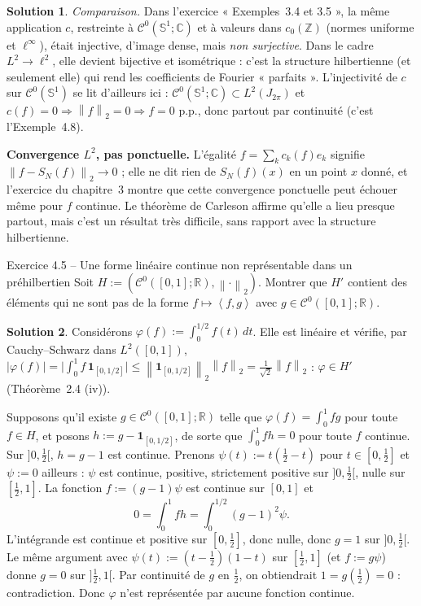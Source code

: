 \documentclass[11pt,a4paper]{article}
\newcommand{\R}{\mathbb{R}}
\newcommand{\Z}{\mathbb{Z}}
\newcommand{\C}{\mathbb{C}}
\newcommand{\norm}[1]{\left\|#1\right\|}
\newcommand{\Cz}{\mathcal{C}^0}
\newcommand{\Sun}{\mathbb{S}^1}
\newcommand{\ps}[2]{\left\langle #1,#2\right\rangle}
\theoremstyle{definition}
\newtheorem*{solution}{Solution}
\begin{document}
\begin{solution}
\emph{Comparaison.} Dans l'exercice « Exemples~3.4 et 3.5 », la même application $c$, restreinte à $\Cz(\Sun;\C)$ et à valeurs dans $c_0(\Z)$ (normes uniforme et $\ell^\infty$), était injective, d'image dense, mais \emph{non surjective}. Dans le cadre $L^2\to\ell^2$, elle devient bijective et isométrique : c'est la structure hilbertienne (et seulement elle) qui rend les coefficients de Fourier « parfaits ». L'injectivité de $c$ sur $\Cz(\Sun)$ se lit d'ailleurs ici : $\Cz(\Sun;\C)\subset L^2(J_{2\pi})$ et $c(f)=0\Rightarrow\norm f_2=0\Rightarrow f=0$ p.p., donc partout par continuité (c'est l'Exemple~4.8).
\end{solution}

\begin{piege}
\textbf{Convergence $L^2$, pas ponctuelle.} L'égalité $f=\sum_kc_k(f)e_k$ signifie $\norm{f-S_N(f)}_2\to0$ ; elle ne dit rien de $S_N(f)(x)$ en un point $x$ donné, et l'exercice du chapitre~3 montre que cette convergence ponctuelle peut échouer même pour $f$ continue. Le théorème de Carleson affirme qu'elle a lieu presque partout, mais c'est un résultat très difficile, sans rapport avec la structure hilbertienne.
\end{piege}

\begin{exo}{Exercice 4.5 -- Une forme linéaire continue non représentable dans un préhilbertien}
Soit $H:=(\Cz([0,1];\R),\norm\cdot_2)$. Montrer que $H'$ contient des éléments qui ne sont pas de la forme $f\mapsto\ps fg$ avec $g\in\Cz([0,1];\R)$.
\end{exo}

\begin{solution}
Considérons $\varphi(f):=\int_0^{1/2}f(t)\,dt$. Elle est linéaire et vérifie, par Cauchy--Schwarz dans $L^2([0,1])$, $|\varphi(f)|=\big|\int_0^1f\,\mathbf 1_{[0,1/2]}\big|\le\norm{\mathbf 1_{[0,1/2]}}_2\norm f_2=\frac1{\sqrt2}\norm f_2$ : $\varphi\in H'$ (Théorème~2.4 (iv)).

Supposons qu'il existe $g\in\Cz([0,1];\R)$ telle que $\varphi(f)=\int_0^1fg$ pour toute $f\in H$, et posons $h:=g-\mathbf 1_{[0,1/2]}$, de sorte que $\int_0^1fh=0$ pour toute $f$ continue. Sur $]0,\tfrac12[$, $h=g-1$ est continue. Prenons $\psi(t):=t(\tfrac12-t)$ pour $t\in[0,\tfrac12]$ et $\psi:=0$ ailleurs : $\psi$ est continue, positive, strictement positive sur $]0,\tfrac12[$, nulle sur $[\tfrac12,1]$. La fonction $f:=(g-1)\psi$ est continue sur $[0,1]$ et
\[
0=\int_0^1fh=\int_0^{1/2}(g-1)^2\psi .
\]
L'intégrande est continue et positive sur $[0,\tfrac12]$, donc nulle, donc $g=1$ sur $]0,\tfrac12[$. Le même argument avec $\psi(t):=(t-\tfrac12)(1-t)$ sur $[\tfrac12,1]$ (et $f:=g\psi$) donne $g=0$ sur $]\tfrac12,1[$. Par continuité de $g$ en $\tfrac12$, on obtiendrait $1=g(\tfrac12)=0$ : contradiction. Donc $\varphi$ n'est représentée par aucune fonction continue.
\end{solution}
\end{document}
